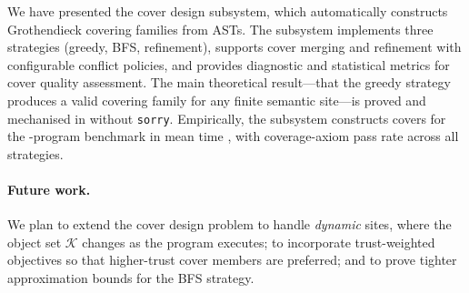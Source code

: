 \documentclass[11pt]{article}
\begin{document}
We have presented the \JuGeo{} cover design subsystem, which
automatically constructs Grothendieck covering families from \Python{}
ASTs.
The subsystem implements three strategies (greedy, BFS, refinement),
supports cover merging and refinement with configurable conflict
policies, and provides diagnostic and statistical metrics for cover
quality assessment.
The main theoretical result---that the greedy strategy produces a
valid covering family for any finite semantic site---is proved and
mechanised in \LEAN{} without \texttt{sorry}.
Empirically, the subsystem constructs covers for the \expTotalPrograms-program benchmark
in mean time \expTimeMean, with \expAccuracy{} coverage-axiom
pass rate across all strategies.

\paragraph{Future work.}
We plan to extend the cover design problem to handle \emph{dynamic}
sites, where the object set $\mathcal{K}$ changes as the program
executes; to incorporate trust-weighted objectives so that
higher-trust cover members are preferred; and to prove tighter
approximation bounds for the BFS strategy.
\end{document}
